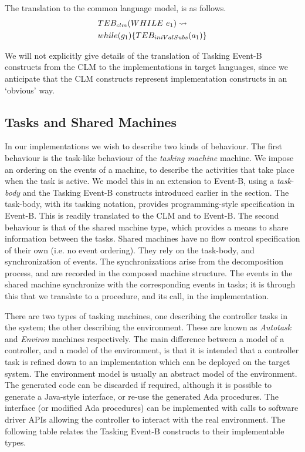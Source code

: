 The translation to the common language model, is as follows.
\begin{equation}
\begin{split}
&TEB_{clm}(WHILE~ e_1 ) \leadsto\\
& while(g_1)\{ TEB_{iniValSubs}(a_1) \}
\end{split}
\notag
\end{equation}

We will not explicitly give details of the translation of Tasking Event-B constructs from the CLM to the implementations in target languages, since we anticipate that the CLM constructs represent implementation constructs in an `obvious' way. 

\subsection{Tasks and Shared Machines}\label{tasks}
In our implementations we wish to describe two kinds of behaviour. The first behaviour is the task-like behaviour of the \emph{tasking machine} machine. We impose an ordering on the events of a machine, to describe the activities that take place when the task is active. We model this in an extension to Event-B, using a \emph{task-body} and the Tasking Event-B constructs introduced earlier in the section. The task-body, with its tasking notation, provides programming-style specification in Event-B. This is readily translated to the CLM and to Event-B. The second behaviour is that of the shared machine type, which provides a means to share information between the tasks. Shared machines have no flow control specification of their own (i.e. no event ordering). They rely on the task-body, and synchronization of events. The synchronizations arise from the decomposition process, and are recorded in the composed machine structure. The events in the shared machine synchronize with the corresponding events in tasks; it is through this that we translate to a procedure, and its call, in the implementation. 

There are two types of tasking machines, one describing the controller tasks in the system; the other describing the environment. These are known as \emph{Autotask} and \emph{Environ} machines respectively. The main difference between a model of a controller, and a model of the environment, is that it is intended that a controller task is refined down to an implementation which can be deployed on the target system. The environment model is usually an abstract model of the environment. The generated code can be discarded if required, although it is possible to generate a Java-style interface, or re-use the generated Ada procedures. The interface (or modified Ada procedures) can be implemented with calls to software driver APIs allowing the controller to interact with the real environment. The following table relates the Tasking Event-B constructs to their implementable types.
%


